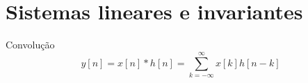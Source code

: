 \documentclass[
size=17pt,
paper=smartboard,
mode=present,
display=slidesnotes,
style=sailor,
nopagebreaks,
blackslide,
fleqn]{powerdot}
\begin{document}
\section[slide=false]{Sistemas lineares e invariantes} 
\begin{slide}{Convolução}
   \begin{equation*}
      y[n]=x[n]*h[n]=\sum_{k=-\infty}^{\infty}x[k]h[n-k]
   \end{equation*}
   \begin{center}

\end{center}
\end{slide}
\end{document}
